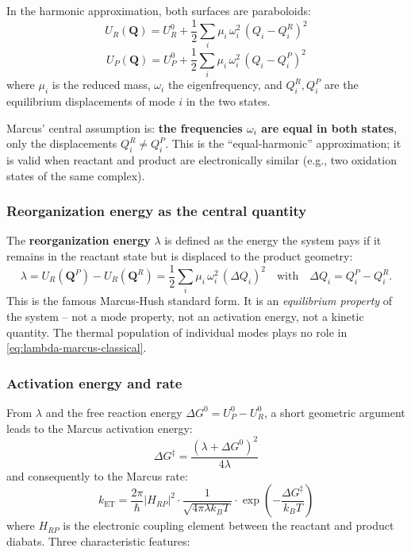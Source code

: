\documentclass[11pt,a4paper,twoside]{article}
\theoremstyle{remark}
\begin{document}
In the harmonic approximation, both surfaces are paraboloids:
\begin{equation}
  U_R(\mathbf{Q}) = U_R^0 + \frac{1}{2}\sum_i \mu_i\,\omega_i^2\,
                       (Q_i - Q_i^R)^2
\end{equation}
\begin{equation}
  U_P(\mathbf{Q}) = U_P^0 + \frac{1}{2}\sum_i \mu_i\,\omega_i^2\,
                       (Q_i - Q_i^P)^2
\end{equation}
where $\mu_i$ is the reduced mass, $\omega_i$ the eigenfrequency,
and $Q_i^R, Q_i^P$ are the equilibrium displacements of mode $i$ in
the two states.

Marcus' central assumption is: \textbf{the frequencies $\omega_i$
are equal in both states}, only the displacements
$Q_i^R \neq Q_i^P$. This is the ``equal-harmonic'' approximation; it
is valid when reactant and product are electronically similar
(e.g., two oxidation states of the same complex).

\subsubsection*{Reorganization energy as the central quantity}

The \textbf{reorganization energy} $\lambda$ is defined as the
energy the system pays if it remains in the reactant state but is
displaced to the product geometry:
\begin{equation}
  \lambda = U_R(\mathbf{Q}^P) - U_R(\mathbf{Q}^R)
          = \frac{1}{2}\sum_i \mu_i\,\omega_i^2\,(\Delta Q_i)^2
  \quad\text{with}\quad \Delta Q_i = Q_i^P - Q_i^R.
  \label{eq:lambda-marcus-classical}
\end{equation}
This is the famous Marcus-Hush standard form. It is an
\emph{equilibrium property} of the system -- not a mode property,
not an activation energy, not a kinetic quantity. The thermal
population of individual modes plays no role in
\eqref{eq:lambda-marcus-classical}.

\subsubsection*{Activation energy and rate}

From $\lambda$ and the free reaction energy
$\Delta G^0 = U_P^0 - U_R^0$, a short geometric argument leads to
the Marcus activation energy:
\begin{equation}
  \Delta G^\ddagger = \frac{(\lambda + \Delta G^0)^2}{4\lambda}
\end{equation}
and consequently to the Marcus rate:
\begin{equation}
  k_\text{ET} = \frac{2\pi}{\hbar}|H_{RP}|^2 \cdot
                \frac{1}{\sqrt{4\pi\lambda k_BT}} \cdot
                \exp\!\left(-\frac{\Delta G^\ddagger}{k_BT}\right)
  \label{eq:marcus-rate}
\end{equation}
where $H_{RP}$ is the electronic coupling element between the
reactant and product diabats. Three characteristic features:
\end{document}
